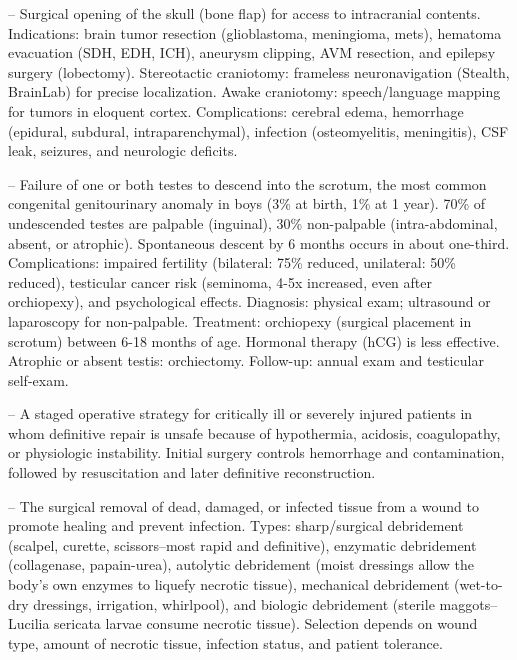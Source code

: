 -- Surgical opening of the skull (bone flap) for access to intracranial contents. Indications: brain tumor resection (glioblastoma, meningioma, mets), hematoma evacuation (SDH, EDH, ICH), aneurysm clipping, AVM resection, and epilepsy surgery (lobectomy). Stereotactic craniotomy: frameless neuronavigation (Stealth, BrainLab) for precise localization. Awake craniotomy: speech/language mapping for tumors in eloquent cortex. Complications: cerebral edema, hemorrhage (epidural, subdural, intraparenchymal), infection (osteomyelitis, meningitis), CSF leak, seizures, and neurologic deficits.

-- Failure of one or both testes to descend into the scrotum, the most common congenital genitourinary anomaly in boys (3\% at birth, 1\% at 1 year). 70\% of undescended testes are palpable (inguinal), 30\% non-palpable (intra-abdominal, absent, or atrophic). Spontaneous descent by 6 months occurs in about one-third. Complications: impaired fertility (bilateral: 75\% reduced, unilateral: 50\% reduced), testicular cancer risk (seminoma, 4-5x increased, even after orchiopexy), and psychological effects. Diagnosis: physical exam; ultrasound or laparoscopy for non-palpable. Treatment: orchiopexy (surgical placement in scrotum) between 6-18 months of age. Hormonal therapy (hCG) is less effective. Atrophic or absent testis: orchiectomy. Follow-up: annual exam and testicular self-exam.

-- A staged operative strategy for critically ill or severely injured patients in whom definitive repair is unsafe because of hypothermia, acidosis, coagulopathy, or physiologic instability. Initial surgery controls hemorrhage and contamination, followed by resuscitation and later definitive reconstruction.

-- The surgical removal of dead, damaged, or infected tissue from a wound to promote healing and prevent infection. Types: sharp/surgical debridement (scalpel, curette, scissors--most rapid and definitive), enzymatic debridement (collagenase, papain-urea), autolytic debridement (moist dressings allow the body's own enzymes to liquefy necrotic tissue), mechanical debridement (wet-to-dry dressings, irrigation, whirlpool), and biologic debridement (sterile maggots--Lucilia sericata larvae consume necrotic tissue). Selection depends on wound type, amount of necrotic tissue, infection status, and patient tolerance.

